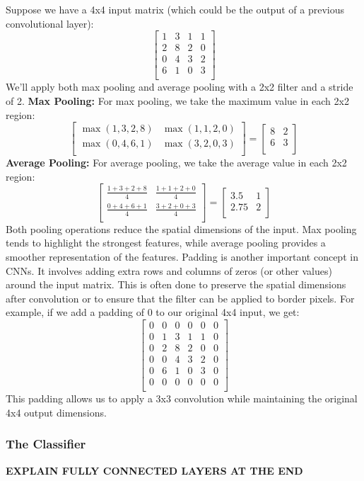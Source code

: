 Suppose we have a 4x4 input matrix (which could be the output of a previous convolutional layer):
\[
\begin{bmatrix}
1 & 3 & 1 & 1 \\
2 & 8 & 2 & 0 \\
0 & 4 & 3 & 2 \\
6 & 1 & 0 & 3 \\
\end{bmatrix}
\]
We'll apply both max pooling and average pooling with a 2x2 filter and a stride of 2.
\textbf{Max Pooling:}
For max pooling, we take the maximum value in each 2x2 region:
\[
\begin{bmatrix}
\max(1,3,2,8) & \max(1,1,2,0) \\
\max(0,4,6,1) & \max(3,2,0,3)\\
\end{bmatrix} =
\begin{bmatrix}
8 & 2 \\
6 & 3 \\
\end{bmatrix}
\]
\textbf{Average Pooling:}
For average pooling, we take the average value in each 2x2 region:
\[
\begin{bmatrix}
\frac{1+3+2+8}{4} & \frac{1+1+2+0}{4} \\
\frac{0+4+6+1}{4} & \frac{3+2+0+3}{4} \\
\end{bmatrix} =
\begin{bmatrix}
3.5 & 1 \\
2.75 & 2 \\
\end{bmatrix}
\]
Both pooling operations reduce the spatial dimensions of the input. Max pooling tends to highlight the strongest features, while average pooling provides a smoother representation of the features.
Padding is another important concept in CNNs. It involves adding extra rows and columns of zeros (or other values) around the input matrix. This is often done to preserve the spatial dimensions after convolution or to ensure that the filter can be applied to border pixels. For example, if we add a padding of 0 to our original 4x4 input, we get:
\[
\begin{bmatrix}
0 & 0 & 0 & 0 & 0 & 0 \\
0 & 1 & 3 & 1 & 1 & 0 \\
0 & 2 & 8 & 2 & 0 & 0 \\
0 & 0 & 4 & 3 & 2 & 0 \\
0 & 6 & 1 & 0 & 3 & 0 \\
0 & 0 & 0 & 0 & 0 & 0 \\
\end{bmatrix}
\]
This padding allows us to apply a 3x3 convolution while maintaining the original 4x4 output dimensions.

\subsubsection{The Classifier}
\textbf{EXPLAIN FULLY CONNECTED LAYERS AT THE END}